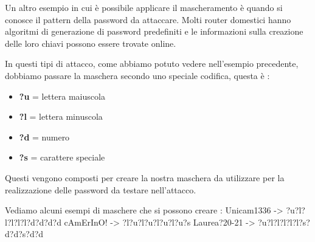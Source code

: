 Un altro esempio in cui è possibile applicare il mascheramento è quando si conosce il pattern della password da attaccare. Molti router domestici hanno algoritmi di generazione di password predefiniti e le informazioni sulla creazione delle loro chiavi possono essere trovate online.

In questi tipi di attacco, come abbiamo potuto vedere nell'esempio precedente, dobbiamo passare la maschera secondo uno speciale codifica, questa è :

\begin{itemize}
    \item \textbf{?u} = lettera maiuscola
    \item \textbf{?l} = lettera minuscola
    \item \textbf{?d} = numero
    \item \textbf{?s} = carattere speciale
\end{itemize}

Questi vengono composti per creare la nostra maschera da utilizzare per la realizzazione delle password da testare nell'attacco.

Vediamo alcuni esempi di maschere che si possono creare :
\newline
\newline
Unicam1336   -> ?u?l?l?l?l?l?d?d?d?d \newline
cAmErInO!    -> ?l?u?l?u?l?u?l?u?s \newline
Laurea?20-21 -> ?u?l?l?l?l?l?s?d?d?s?d?d \newline